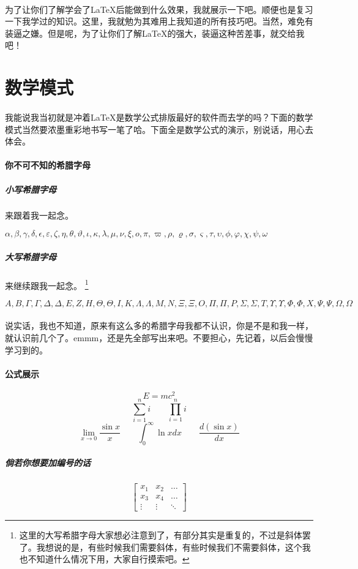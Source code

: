 \documentclass[UTF8,11pt,titlepage,a4paper]{ctexart}
\begin{document}
   \paragraph*{}为了让你们了解学会了LaTeX后能做到什么效果，我就展示一下吧。顺便也是复习一下我学过的知识。这里，我就勉为其难用上我知道的所有技巧吧。当然，难免有装逼之嫌。但是呢，为了让你们了解LaTeX的强大，装逼这种苦差事，就交给我吧！
   \section{数学模式}
   \paragraph*{}我能说我当初就是冲着LaTeX是数学公式排版最好的软件而去学的吗？下面的数学模式当然要浓墨重彩地书写一笔了哈。下面全是数学公式的演示，别说话，用心去体会。
    \paragraph{你不可不知的希腊字母}
    \subparagraph{小写希腊字母} 来跟着我一起念。\par 
    $ \alpha,\beta,\gamma,\delta,\epsilon,\varepsilon,\zeta,\eta,\theta,\vartheta,\iota,\kappa,\lambda,\mu,\nu,\xi,o,\pi,\varpi,\rho,\varrho,\sigma,\varsigma,\tau,\upsilon,\phi,\varphi,\chi,\psi,\omega $ 
    \subparagraph{大写希腊字母}来继续跟我一起念。 \footnote{这里的大写希腊字母大家想必注意到了，有部分其实是重复的，不过是斜体罢了。我想说的是，有些时候我们需要斜体，有些时候我们不需要斜体，这个我也不知道什么情况下用，大家自行摸索吧。}  \par
    $ A,B,\Gamma,\varGamma,\Delta,\varDelta,E,Z,H,\Theta,\varTheta,I,K,\Lambda,\varLambda,M,N,\Xi,\varXi,O,\Pi,\varPi,P,\Sigma,\varSigma,T,\Upsilon,\varUpsilon,\Phi,\varPhi,X,\Psi,\varPsi,\Omega,\varOmega $
   \paragraph*{}\par 说实话，我也不知道，原来有这么多的希腊字母我都不认识，你是不是和我一样，就认识前几个了。emmm，还是先全部写出来吧。不要担心，先记着，以后会慢慢学习到的。
   \paragraph{公式展示}
   \[ \boxed{E=mc^2} \]
   \[  \sum_{i=1}^{n}i \qquad \prod_{i=1}^{n}i\]
   \[ \lim_{x\to0}\frac{\sin x}{x} \qquad \int_{0}^{\infty}\ln x dx\qquad \frac{d(\sin x)}{dx}\]
   \subparagraph*{倘若你想要加编号的话}
   \begin{equation}
   	\begin{bmatrix}
   	x_1 & x_2 & \dots \\
   	x_3 & x_4 & \dots \\
   	\vdots & \vdots & \ddots
   	\end{bmatrix}
   	\end{equation}
   
\end{document}
